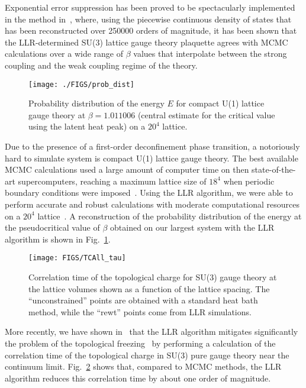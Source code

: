 \documentclass[a4paper]{jpconf}
\begin{document}
% 
Exponential error suppression has been proved to be spectacularly
implemented in the method in~\cite{Langfeld:2012ah}, where, using the
piecewise continuous density of states that has been reconstructed
over 250000 orders of magnitude, it has been shown that the
LLR-determined SU(3) lattice gauge theory plaquette agrees with MCMC
calculations over a wide range of $\beta$ values that interpolate
between the strong coupling and the weak coupling regime of the
theory.

%
\begin{figure}[ht]
\begin{center}
  \texttt{[image: ./FIGS/prob\_dist]} 
\end{center}
\caption{Probability distribution of the energy $E$ for compact U(1)
 lattice gauge theory at $\beta = 1.011006$ (central estimate for the
 critical value using the latent heat peak) on a $20^4$ lattice. \label{fig:2}}
\end{figure}
Due to the presence of a first-order deconfinement phase transition, a
notoriously hard to simulate system is compact U(1) lattice gauge
theory. The best available MCMC calculations used a large amount of
computer time on then state-of-the-art supercomputers, reaching a
maximum lattice size of $18^4$ when periodic boundary conditions were
imposed~\cite{Arnold:2002jk}.  Using the LLR algorithm, we were able
to perform accurate and robust calculations with 
moderate computational resources on a $20^4$ lattice~\cite{Langfeld:2015fua}. A
reconstruction of the probability distribution of the energy at the
pseudocritical value of $\beta$ obtained on our largest system with the LLR algorithm is
shown in Fig.~\ref{fig:2}.

\begin{figure}[ht]
\begin{center}
\texttt{[image: FIGS/TCAll\_tau]}
\end{center}
\caption{Correlation time of the topological charge for SU(3) gauge
  theory at the lattice volumes shown as a function of the lattice
  spacing. The ``unconstrained'' points are obtained with a standard
  heat bath method, while the ``rewt'' points come from LLR simulations.\label{fig:3}}
\end{figure}
More recently, we have shown in~\cite{Cossu:2021bgn} that the LLR
algorithm mitigates significantly
the problem of the topological freezing~\cite{Schaefer:2010hu} by
performing a calculation of the correlation time of the topological
charge in SU(3) pure gauge
theory near the continuum limit. Fig.~\ref{fig:3} shows that, compared
to MCMC methods, the LLR algorithm reduces this correlation time by
about one order of magnitude.
\end{document}
